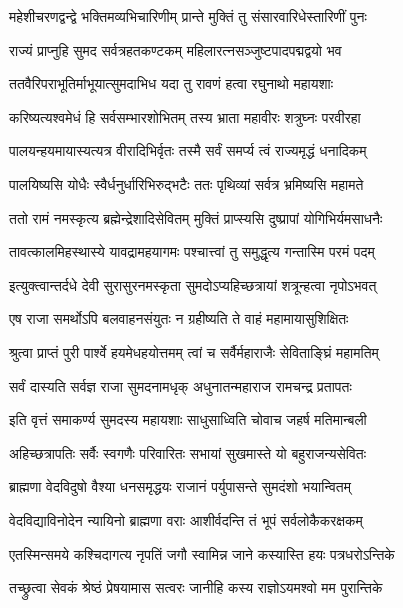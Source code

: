 \twolineshloka
{महेशीचरणद्वन्द्वे भक्तिमव्यभिचारिणीम्}
{प्रान्ते मुक्तिं तु संसारवारिधेस्तारिणीं पुनः}%


\twolineshloka
{राज्यं प्राप्नुहि सुमद सर्वत्रहतकण्टकम्}
{महिलारत्नसञ्जुष्टपादपद्मद्वयो भव}%

\twolineshloka
{ततवैरिपराभूतिर्माभूयात्सुमदाभिध}
{यदा तु रावणं हत्वा रघुनाथो महायशाः}%

\twolineshloka
{करिष्यत्यश्वमेधं हि सर्वसम्भारशोभितम्}
{तस्य भ्राता महावीरः शत्रुघ्नः परवीरहा}%

\twolineshloka
{पालयन्हयमायास्यत्यत्र वीरादिभिर्वृतः}
{तस्मै सर्वं समर्प्य त्वं राज्यमृद्धं धनादिकम्}%

\twolineshloka
{पालयिष्यसि योधैः स्वैर्धनुर्धारिभिरुद्भटैः}
{ततः पृथिव्यां सर्वत्र भ्रमिष्यसि महामते}%

\twolineshloka
{ततो रामं नमस्कृत्य ब्रह्मेन्द्रेशादिसेवितम्}
{मुक्तिं प्राप्स्यसि दुष्प्रापां योगिभिर्यमसाधनैः}%

\twolineshloka
{तावत्कालमिहस्थास्ये यावद्रामहयागमः}
{पश्चात्त्वां तु समुद्धृत्य गन्तास्मि परमं पदम्}%

\twolineshloka
{इत्युक्त्वान्तर्दधे देवी सुरासुरनमस्कृता}
{सुमदोऽप्यहिच्छत्रायां शत्रून्हत्वा नृपोऽभवत्}%

\twolineshloka
{एष राजा समर्थोऽपि बलवाहनसंयुतः}
{न ग्रहीष्यति ते वाहं महामायासुशिक्षितः}%

\twolineshloka
{श्रुत्वा प्राप्तं पुरी पार्श्वे हयमेधहयोत्तमम्}
{त्वां च सर्वैर्महाराजैः सेविताङ्घ्रिं महामतिम्}%

\twolineshloka
{सर्वं दास्यति सर्वज्ञ राजा सुमदनामधृक्}
{अधुनातन्महाराज रामचन्द्र प्रतापतः}%


\twolineshloka
{इति वृत्तं समाकर्ण्य सुमदस्य महायशाः}
{साधुसाध्विति चोवाच जहर्ष मतिमान्बली}%

\twolineshloka
{अहिच्छत्रापतिः सर्वैः स्वगणैः परिवारितः}
{सभायां सुखमास्ते यो बहुराजन्यसेवितः}%

\twolineshloka
{ब्राह्मणा वेदविदुषो वैश्या धनसमृद्धयः}
{राजानं पर्युपासन्ते सुमदंशो भयान्वितम्}%

\twolineshloka
{वेदविद्याविनोदेन न्यायिनो ब्राह्मणा वराः}
{आशीर्वदन्ति तं भूपं सर्वलोकैकरक्षकम्}%

\twolineshloka
{एतस्मिन्समये कश्चिदागत्य नृपतिं जगौ}
{स्वामिन्न जाने कस्यास्ति हयः पत्रधरोऽन्तिके}%

\twolineshloka
{तच्छ्रुत्वा सेवकं श्रेष्ठं प्रेषयामास सत्वरः}
{जानीहि कस्य राज्ञोऽयमश्वो मम पुरान्तिके}%

